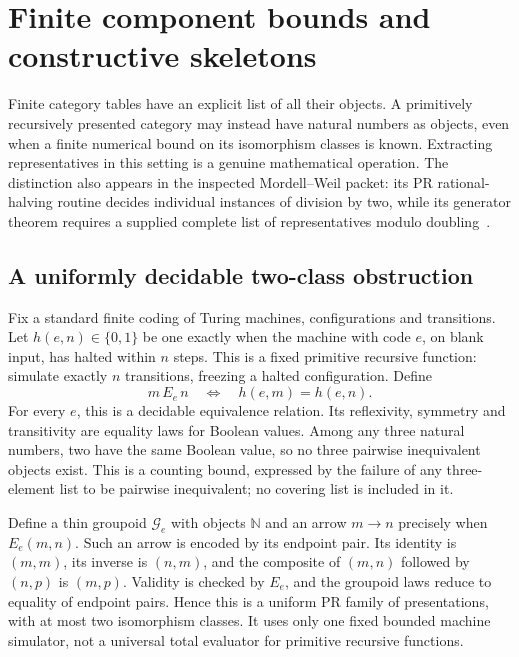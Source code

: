 \section{Finite component bounds and constructive skeletons}
\label{sec:groupoid-skeletons}

Finite category tables have an explicit list of all their objects. A
primitively recursively presented category may instead have natural
numbers as objects, even when a finite numerical bound on its
isomorphism classes is known. Extracting representatives in this setting
is a genuine mathematical operation. The distinction also appears in
the inspected Mordell--Weil packet: its PR rational-halving routine
decides individual instances of division by two, while its generator
theorem requires a supplied complete list of representatives modulo
doubling~\cite{repo-mw}.

\subsection{A uniformly decidable two-class obstruction}

Fix a standard finite coding of Turing machines, configurations and
transitions. Let $h(e,n)\in\{0,1\}$ be one exactly when the machine
with code $e$, on blank input, has halted within $n$ steps. This is a
fixed primitive recursive function: simulate exactly $n$ transitions,
freezing a halted configuration. Define
\[
                 m\,E_e\,n\quad\Longleftrightarrow\quad
                            h(e,m)=h(e,n).
\]
For every $e$, this is a decidable equivalence relation. Its reflexivity,
symmetry and transitivity are equality laws for Boolean values. Among
any three natural numbers, two have the same Boolean value, so no three
pairwise inequivalent objects exist.
This is a counting bound, expressed by the failure of any three-element
list to be pairwise inequivalent; no covering list is included in it.

Define a thin groupoid $\mathcal G_e$ with objects $\mathbb N$ and an
arrow $m\longrightarrow n$ precisely when $E_e(m,n)$. Such an arrow
is encoded by its endpoint pair. Its identity is $(m,m)$, its inverse
is $(n,m)$, and the composite of $(m,n)$ followed by $(n,p)$ is
$(m,p)$. Validity is checked by $E_e$, and the groupoid laws reduce
to equality of endpoint pairs. Hence this is a uniform PR family of
presentations, with at most two isomorphism classes. It uses only one
fixed bounded machine simulator, not a universal total evaluator for
primitive recursive functions.

